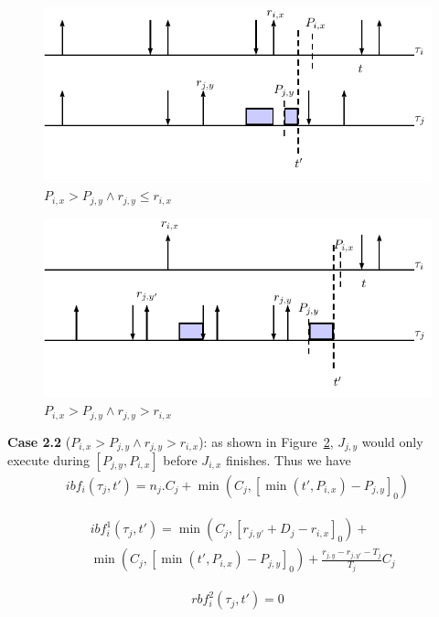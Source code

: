 \begin{figure}[h!]
 \centering
\includegraphics[scale=0.7]{Figure/C4}  
\caption{$P_{i,x}>P_{j,y}\wedge r_{j,y}\leq r_{i,x}$}
  \label{fig:case5}
\end{figure}

\begin{figure}[h!]
 \centering
\includegraphics[scale=0.7]{Figure/C41}  
\caption{$P_{i,x}>P_{j,y}\wedge r_{j,y}> r_{i,x} $}
  \label{fig:case6}
\end{figure}

\textbf{Case 2.2} ($P_{i,x}>P_{j,y}\wedge r_{j,y}> r_{i,x}$): as shown in  Figure~\ref{fig:case6}, $J_{j,y}$ would only execute during $[P_{j,y},P_{i,x}]$ before $J_{i,x}$ finishes. Thus we have
\begin{align*}
	ibf_i(\tau_j,t')=n_j.C_j+\min\left(C_j,[\min(t',P_{i,x})-P_{j,y}]_0\right)
\end{align*}


\begin{align*}
&ibf_{i}^1(\tau_j,t')=\min(C_j,[r_{j,y'}+D_j-r_{i,x}]_0)+\\
&\min\left(C_j,[\min(t',P_{i,x})-P_{j,y}]_0\right)+\frac{r_{j,y}-r_{j,y'}-T_j}{T_j}C_j
\end{align*}

\begin{align*}
rbf_{i}^2(\tau_j,t')=0
\end{align*}





